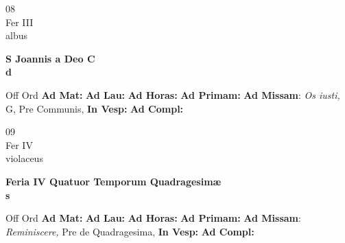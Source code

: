 \documentclass[10pt, openany]{book}
\begin{document}
    \begin{center}
        \begin{minipage}{3.5in}
            \vspace{2em}
            \begin{minipage}{0.5in}
                {\Huge 08} \\
                {\normalsize Fer III} \\
                {\normalsize albus}
            \end{minipage}
            \begin{minipage}{3.0in}
                \textbf{ \large S Joannis a Deo C \\
                \textnormal{\normalsize d}} \\ 
            \end{minipage}
            \begin{justify}Off Ord
                \textbf{Ad Mat: }
                \textbf{Ad Lau: }
                \textbf{Ad Horas: }
                \textbf{Ad Primam: }\textbf{Ad Missam}: \textit{Os iusti,} G, Pre Communis,  
                \textbf{In Vesp: }
                \textbf{Ad Compl: }
            \end{justify}
        \end{minipage}
    \end{center}

    \begin{center}
        \begin{minipage}{3.5in}
            \vspace{2em}
            \begin{minipage}{0.5in}
                {\Huge 09} \\
                {\normalsize Fer IV} \\
                {\normalsize violaceus}
            \end{minipage}
            \begin{minipage}{3.0in}
                \textbf{ \large Feria IV Quatuor Temporum Quadragesimæ \\
                \textnormal{\normalsize s}} \\ 
            \end{minipage}
            \begin{justify}Off Ord
                \textbf{Ad Mat: }
                \textbf{Ad Lau: }
                \textbf{Ad Horas: }
                \textbf{Ad Primam: }\textbf{Ad Missam}: \textit{Reminiscere,} Pre de Quadragesima,  
                \textbf{In Vesp: }
                \textbf{Ad Compl: }
            \end{justify}
        \end{minipage}
    \end{center}
\end{document}
